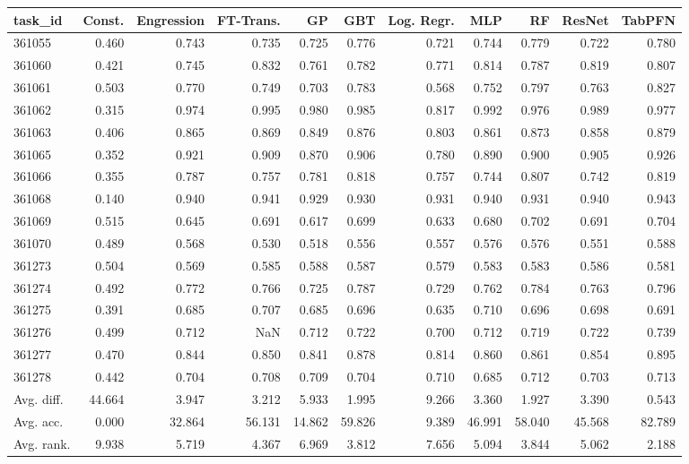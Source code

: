 \begin{tabular}{lrrrrrrrrrr}
\toprule
task\_id & Const. & Engression & FT-Trans. & GP & GBT & Log. Regr. & MLP & RF & ResNet & TabPFN \\
\midrule
361055 & 0.460 & 0.743 & 0.735 & 0.725 & 0.776 & 0.721 & 0.744 & 0.779 & 0.722 & 0.780 \\
361060 & 0.421 & 0.745 & 0.832 & 0.761 & 0.782 & 0.771 & 0.814 & 0.787 & 0.819 & 0.807 \\
361061 & 0.503 & 0.770 & 0.749 & 0.703 & 0.783 & 0.568 & 0.752 & 0.797 & 0.763 & 0.827 \\
361062 & 0.315 & 0.974 & 0.995 & 0.980 & 0.985 & 0.817 & 0.992 & 0.976 & 0.989 & 0.977 \\
361063 & 0.406 & 0.865 & 0.869 & 0.849 & 0.876 & 0.803 & 0.861 & 0.873 & 0.858 & 0.879 \\
361065 & 0.352 & 0.921 & 0.909 & 0.870 & 0.906 & 0.780 & 0.890 & 0.900 & 0.905 & 0.926 \\
361066 & 0.355 & 0.787 & 0.757 & 0.781 & 0.818 & 0.757 & 0.744 & 0.807 & 0.742 & 0.819 \\
361068 & 0.140 & 0.940 & 0.941 & 0.929 & 0.930 & 0.931 & 0.940 & 0.931 & 0.940 & 0.943 \\
361069 & 0.515 & 0.645 & 0.691 & 0.617 & 0.699 & 0.633 & 0.680 & 0.702 & 0.691 & 0.704 \\
361070 & 0.489 & 0.568 & 0.530 & 0.518 & 0.556 & 0.557 & 0.576 & 0.576 & 0.551 & 0.588 \\
361273 & 0.504 & 0.569 & 0.585 & 0.588 & 0.587 & 0.579 & 0.583 & 0.583 & 0.586 & 0.581 \\
361274 & 0.492 & 0.772 & 0.766 & 0.725 & 0.787 & 0.729 & 0.762 & 0.784 & 0.763 & 0.796 \\
361275 & 0.391 & 0.685 & 0.707 & 0.685 & 0.696 & 0.635 & 0.710 & 0.696 & 0.698 & 0.691 \\
361276 & 0.499 & 0.712 & NaN & 0.712 & 0.722 & 0.700 & 0.712 & 0.719 & 0.722 & 0.739 \\
361277 & 0.470 & 0.844 & 0.850 & 0.841 & 0.878 & 0.814 & 0.860 & 0.861 & 0.854 & 0.895 \\
361278 & 0.442 & 0.704 & 0.708 & 0.709 & 0.704 & 0.710 & 0.685 & 0.712 & 0.703 & 0.713 \\
Avg. diff. & 44.664 & 3.947 & 3.212 & 5.933 & 1.995 & 9.266 & 3.360 & 1.927 & 3.390 & 0.543 \\
Avg. acc. & 0.000 & 32.864 & 56.131 & 14.862 & 59.826 & 9.389 & 46.991 & 58.040 & 45.568 & 82.789 \\
Avg. rank. & 9.938 & 5.719 & 4.367 & 6.969 & 3.812 & 7.656 & 5.094 & 3.844 & 5.062 & 2.188 \\
\bottomrule
\end{tabular}
